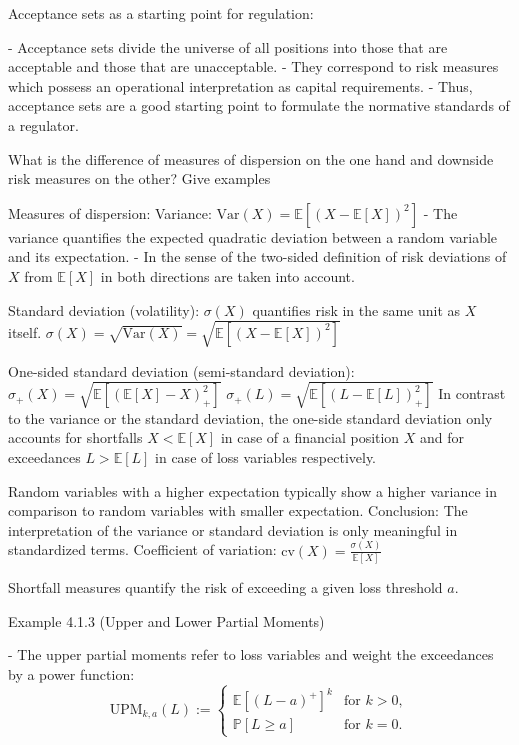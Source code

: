Acceptance sets as a starting point for regulation:

- Acceptance sets divide the universe of all positions into those that are acceptable and those that are unacceptable.
- They correspond to risk measures which possess an operational interpretation as capital requirements.
- Thus, acceptance sets are a good starting point to formulate the normative standards of a regulator.

What is the difference of measures of dispersion on the one hand and downside
risk measures on the other? Give examples

Measures of dispersion:
Variance:  
\(
\text{Var}(X) = \mathbb{E}[(X - \mathbb{E}[X])^2]
\)
- The variance quantifies the expected quadratic deviation between a random variable and its expectation.
- In the sense of the two-sided definition of risk deviations of \(X\) from \(\mathbb{E}[X]\) in both directions are taken into account.

Standard deviation (volatility): \(\sigma(X)\) quantifies risk in the same unit as \(X\) itself.
\(
\sigma(X) = \sqrt{\text{Var}(X)} = \sqrt{\mathbb{E}[(X - \mathbb{E}[X])^2]}
\)

One-sided standard deviation (semi-standard deviation):
\(
\sigma_{+}(X) = \sqrt{\mathbb{E}[(\mathbb{E}[X] - X)_{+}^2]}
\)
\(\sigma_{+}(L) = \sqrt{\mathbb{E}[(L - \mathbb{E}[L])_{+}^2]}\)
In contrast to the variance or the standard deviation, the one-side standard deviation only accounts for shortfalls \(X < \mathbb{E}[X]\) 
in case of a financial position \(X\) and for exceedances \(L > \mathbb{E}[L]\) in case of loss variables respectively.


Random variables with a higher expectation typically show a higher variance in comparison to
random variables with smaller expectation.
Conclusion: The interpretation of the variance or standard deviation is only meaningful in standardized terms.
Coefficient of variation:
\(
\text{cv}(X) = \frac{\sigma(X)}{\mathbb{E}[X]}
\)

Shortfall measures quantify the risk of exceeding a given loss threshold \( a \).

Example 4.1.3 (Upper and Lower Partial Moments)

- The upper partial moments refer to loss variables and weight the exceedances by a power function:
\[
\text{UPM}_{k,a}(L) :=
\begin{cases} 
\mathbb{E}[(L - a)^+]^k & \text{for } k > 0, \\
\mathbb{P}[L \ge a] & \text{for } k = 0.
\end{cases}
\]


